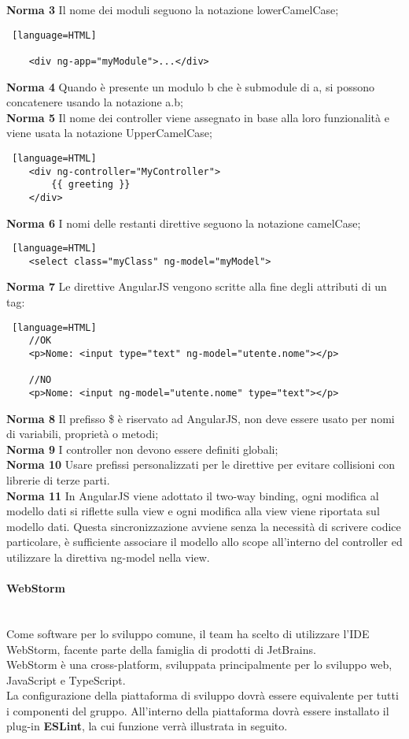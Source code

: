 \textbf{Norma 3}
Il nome dei moduli seguono la notazione lowerCamelCase;
\begin{lstlisting} [language=HTML]
	
	<div ng-app="myModule">...</div>

\end{lstlisting}
\textbf{Norma 4}
Quando è presente un modulo b che è submodule di a, si possono concatenere usando la notazione a.b;\\
\textbf{Norma 5}
Il nome dei controller viene assegnato in base alla loro funzionalità e viene usata la notazione UpperCamelCase;
\begin{lstlisting} [language=HTML]
	<div ng-controller="MyController">
  		{{ greeting }}
	</div>
\end{lstlisting}
\textbf{Norma 6}
I nomi delle restanti direttive seguono la notazione camelCase;
\begin{lstlisting} [language=HTML]
	<select class="myClass" ng-model="myModel">
\end{lstlisting}
\textbf{Norma 7}
Le direttive AngularJS vengono scritte alla fine degli attributi di un tag: 
\begin{lstlisting} [language=HTML]
	//OK
	<p>Nome: <input type="text" ng-model="utente.nome"></p>
	
	//NO
	<p>Nome: <input ng-model="utente.nome" type="text"></p>
\end{lstlisting}
\textbf{Norma 8}
Il prefisso \$ è riservato ad AngularJS, non deve essere usato per nomi di variabili, proprietà o metodi;\\
\textbf{Norma 9}
I controller non devono essere definiti globali;\\
\textbf{Norma 10}
Usare prefissi personalizzati per le direttive per evitare collisioni con librerie di terze parti.\\
\textbf{Norma 11}
In AngularJS viene adottato il two-way binding, ogni modifica al modello dati si riflette sulla view e ogni modifica alla view viene riportata sul modello dati.
Questa sincronizzazione avviene senza la necessità di scrivere codice particolare, è sufficiente associare il modello allo scope all'interno del controller ed utilizzare la direttiva ng-model nella view.


\paragraph{WebStorm}\-\\
Come software per lo sviluppo comune, il team ha scelto di utilizzare l'IDE WebStorm, facente parte della famiglia di prodotti di JetBrains. \\
WebStorm è una cross-platform, sviluppata principalmente per lo sviluppo web, JavaScript e TypeScript. \\
La configurazione della piattaforma di sviluppo dovrà essere equivalente per tutti i componenti del gruppo. All'interno della piattaforma dovrà essere installato il plug-in \textbf{ESLint}, la cui funzione verrà illustrata in seguito.


